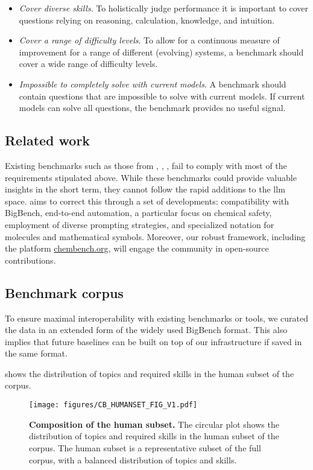 \begin{itemize}
    \item \emph{Cover diverse skills}. To holistically judge performance it is important to cover questions relying on reasoning, calculation, knowledge, and intuition.
    \item \emph{Cover a range of difficulty levels}. To allow for a continuous measure of improvement for a range of different (evolving) systems, a benchmark should cover a wide range of difficulty levels.
    \item \emph{Impossible to completely solve with current models}. A benchmark should contain questions that are impossible to solve with current models. If current models can solve all questions, the benchmark provides no useful signal.
\end{itemize}

\subsection{Related work}
Existing benchmarks such as those from \textcite{guo2023large}, \textcite{sun2023scieval}, \textcite{Schulze_Balhorn_2024}, \textcite{Cai_2024} fail to comply with most of the requirements stipulated above.
While these benchmarks could provide valuable insights in the short term, they cannot follow the rapid additions to the \gls{llm} space.
\chembench aims to correct this through a set of developments: compatibility with BigBench, end-to-end automation, a particular focus on chemical safety, employment of diverse prompting strategies, and specialized notation for molecules and mathematical symbols.
Moreover, our robust framework, including the platform \url{chembench.org}, will engage the community in open-source contributions.

\clearpage
\subsection{Benchmark corpus}
To ensure maximal interoperability with existing benchmarks or tools, we curated the data in an extended form of the widely used BigBench format.\autocite{srivastava2022beyond}
This also implies that future baselines can be built on top of our infrastructure if saved in the same format.

 shows the distribution of topics and required skills in the human subset of the \chembench corpus.

\begin{figure}
    \centering
    \texttt{[image: figures/CB\_HUMANSET\_FIG\_V1.pdf]}
    \caption{\textbf{Composition of the human subset.} The circular plot shows the distribution of topics and required skills in the human subset of the \chembench corpus. The human subset is a representative subset of the full corpus, with a balanced distribution of topics and skills.}
    \label{fig:cb_humanset}
\end{figure}

